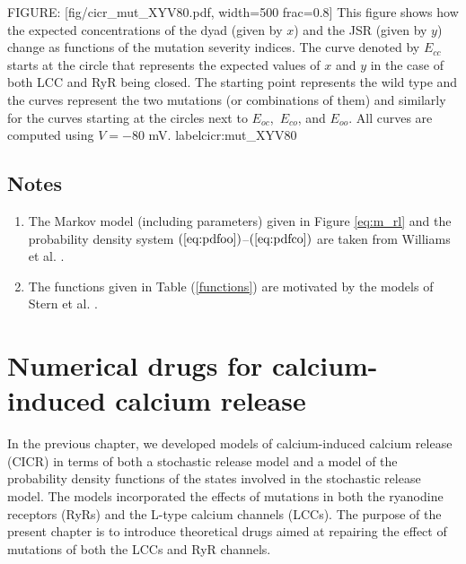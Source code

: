 FIGURE: [fig/cicr_mut_XYV80.pdf, width=500 frac=0.8] This figure shows how the expected concentrations of the dyad (given by $x$) and the JSR (given by $y$) change as functions of the mutation severity indices. The curve denoted by $E_{cc}$ starts at the circle that represents the expected values of $x$ and $y$ in the case of both LCC and RyR being closed. The starting point represents the wild type and the curves represent the two mutations (or combinations of them) and similarly for the curves starting at the circles next to $E_{oc}$,\, $E_{co}$, and $E_{oo}$. All curves are computed using $V=-80$ mV. label{cicr:mut_XYV80}

\section{Notes}

\begin{enumerate}
\item The Markov model  (including parameters)  given in Figure \ref{eq:m_rl} and the probability density system  $(  \ref{eq:pdfoo})$--$(\ref{eq:pdfco})  $
 are taken from Williams et al. \cite{Williams2007}.
\item The functions given in Table (\ref{functions}) are motivated by the models of Stern et al. \cite{Stern1999}.
\end{enumerate}

\chapter[Numerical drugs for CICR]{Numerical drugs for calcium-induced calcium release}



In the previous chapter, we developed models of calcium-induced calcium release (CICR) in terms of both a stochastic release model and a model of the probability density functions of the states involved in the stochastic release model. The models incorporated the effects of mutations in both the ryanodine receptors (RyRs) and the L-type calcium channels (LCCs).
The purpose of the present chapter is to introduce theoretical drugs aimed at repairing the effect of mutations of both the LCCs and RyR channels.

